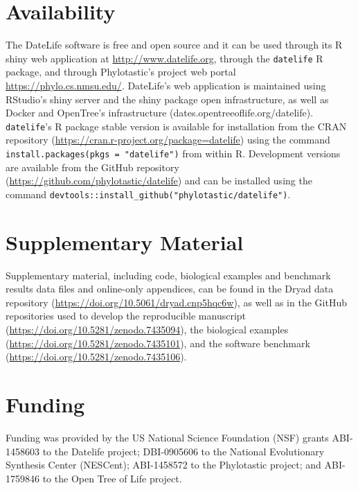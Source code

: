 \documentclass[english,man]{apa6}
\begin{document}
\hypertarget{availability}{%
\section{Availability}\label{availability}}

The DateLife software is free and open source and it can be used through its R shiny web application at \url{http://www.datelife.org}, through the \texttt{datelife} R package, and through Phylotastic's project web portal \url{https://phylo.cs.nmsu.edu/}.
DateLife's web application is maintained using RStudio's shiny server and the shiny package open infrastructure, as well as Docker and OpenTree's infrastructure (dates.opentreeoflife.org/datelife).
\texttt{datelife}'s R package stable version is available for installation from the CRAN repository (\url{https://cran.r-project.org/package=datelife}) using the command \texttt{install.packages(pkgs\ =\ "datelife")} from within R.
Development versions are available from the GitHub repository (\url{https://github.com/phylotastic/datelife}) and can be installed using the command \texttt{devtools::install\_github("phylotastic/datelife")}.

\hypertarget{supplementary-material}{%
\section{Supplementary Material}\label{supplementary-material}}

Supplementary material, including code, biological examples and benchmark results data files and online-only appendices, can be found in the Dryad data repository (\url{https://doi.org/10.5061/dryad.cnp5hqc6w}), as well as in the GitHub repositories used to develop the reproducible manuscript (\url{https://doi.org/10.5281/zenodo.7435094}), the biological examples (\url{https://doi.org/10.5281/zenodo.7435101}), and the software benchmark (\url{https://doi.org/10.5281/zenodo.7435106}).

\hypertarget{funding}{%
\section{Funding}\label{funding}}

Funding was provided by the US National Science Foundation (NSF) grants ABI-1458603 to the Datelife project; DBI-0905606 to the National Evolutionary Synthesis Center (NESCent); ABI-1458572 to the Phylotastic project; and ABI-1759846 to the Open Tree of Life project.
\end{document}
